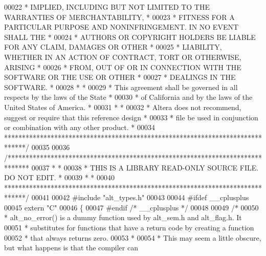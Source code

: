 \begin{DoxyCode}
00022 \textcolor{comment}{* IMPLIED, INCLUDING BUT NOT LIMITED TO THE WARRANTIES OF MERCHANTABILITY,    *}
00023 \textcolor{comment}{* FITNESS FOR A PARTICULAR PURPOSE AND NONINFRINGEMENT. IN NO EVENT SHALL THE *}
00024 \textcolor{comment}{* AUTHORS OR COPYRIGHT HOLDERS BE LIABLE FOR ANY CLAIM, DAMAGES OR OTHER      *}
00025 \textcolor{comment}{* LIABILITY, WHETHER IN AN ACTION OF CONTRACT, TORT OR OTHERWISE, ARISING     *}
00026 \textcolor{comment}{* FROM, OUT OF OR IN CONNECTION WITH THE SOFTWARE OR THE USE OR OTHER         *}
00027 \textcolor{comment}{* DEALINGS IN THE SOFTWARE.                                                   *}
00028 \textcolor{comment}{*                                                                             *}
00029 \textcolor{comment}{* This agreement shall be governed in all respects by the laws of the State   *}
00030 \textcolor{comment}{* of California and by the laws of the United States of America.              *}
00031 \textcolor{comment}{*                                                                             *}
00032 \textcolor{comment}{* Altera does not recommend, suggest or require that this reference design    *}
00033 \textcolor{comment}{* file be used in conjunction or combination with any other product.          *}
00034 \textcolor{comment}{******************************************************************************/}
00035 
00036 \textcolor{comment}{/******************************************************************************}
00037 \textcolor{comment}{*                                                                             *}
00038 \textcolor{comment}{* THIS IS A LIBRARY READ-ONLY SOURCE FILE. DO NOT EDIT.                       *}
00039 \textcolor{comment}{*                                                                             *}
00040 \textcolor{comment}{******************************************************************************/}
00041 
00042 \textcolor{preprocessor}{#include "alt_types.h"}
00043 
00044 \textcolor{preprocessor}{#ifdef \_\_cplusplus}
00045 \textcolor{keyword}{extern} \textcolor{stringliteral}{"C"}
00046 \{
00047 \textcolor{preprocessor}{#endif }\textcolor{comment}{/* \_\_cplusplus */}\textcolor{preprocessor}{}
00048 
00049 \textcolor{comment}{/*}
00050 \textcolor{comment}{ * alt\_no\_error() is a dummy function used by alt\_sem.h and alt\_flag.h. It}
00051 \textcolor{comment}{ * substitutes for functions that have a return code by creating a function }
00052 \textcolor{comment}{ * that always returns zero. }
00053 \textcolor{comment}{ *}
00054 \textcolor{comment}{ * This may seem a little obscure, but what happens is that the compiler can }

\end{DoxyCode}
